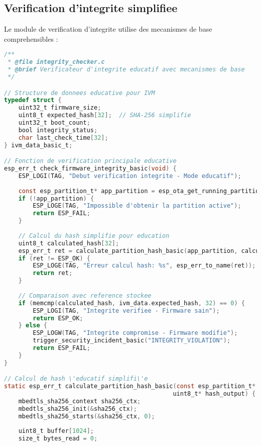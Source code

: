 \subsection{Verification d'integrite simplifiee}

Le module de verification d'integrite utilise des mecanismes de base comprehensibles :

\begin{lstlisting}[language=C, caption={Module de verification d'integrite - integrity\_checker.c}, label=lst:integrity-checker]
/**
 * @file integrity_checker.c
 * @brief Verificateur d'integrite educatif avec mecanismes de base
 */

// Structure de donnees educative pour IVM
typedef struct {
    uint32_t firmware_size;
    uint8_t expected_hash[32];  // SHA-256 simplifie
    uint32_t boot_count;
    bool integrity_status;
    char last_check_time[32];
} ivm_data_basic_t;

// Fonction de verification principale educative
esp_err_t check_firmware_integrity_basic(void) {
    ESP_LOGI(TAG, "Debut verification integrite - Mode educatif");
    
    const esp_partition_t* app_partition = esp_ota_get_running_partition();
    if (!app_partition) {
        ESP_LOGE(TAG, "Impossible d'obtenir la partition active");
        return ESP_FAIL;
    }
    
    // Calcul du hash simplifie pour education
    uint8_t calculated_hash[32];
    esp_err_t ret = calculate_partition_hash_basic(app_partition, calculated_hash);
    if (ret != ESP_OK) {
        ESP_LOGE(TAG, "Erreur calcul hash: %s", esp_err_to_name(ret));
        return ret;
    }
    
    // Comparaison avec reference stockee
    if (memcmp(calculated_hash, ivm_data.expected_hash, 32) == 0) {
        ESP_LOGI(TAG, "Integrite verifiee - Firmware sain");
        return ESP_OK;
    } else {
        ESP_LOGW(TAG, "Integrite compromise - Firmware modifie");
        trigger_security_incident_basic("INTEGRITY_VIOLATION");
        return ESP_FAIL;
    }
}

// Calcul de hash \'educatif simplifi\'e
static esp_err_t calculate_partition_hash_basic(const esp_partition_t* partition, 
                                               uint8_t* hash_output) {
    mbedtls_sha256_context sha256_ctx;
    mbedtls_sha256_init(&sha256_ctx);
    mbedtls_sha256_starts(&sha256_ctx, 0);
    
    uint8_t buffer[1024];
    size_t bytes_read = 0;
    

\end{lstlisting}
